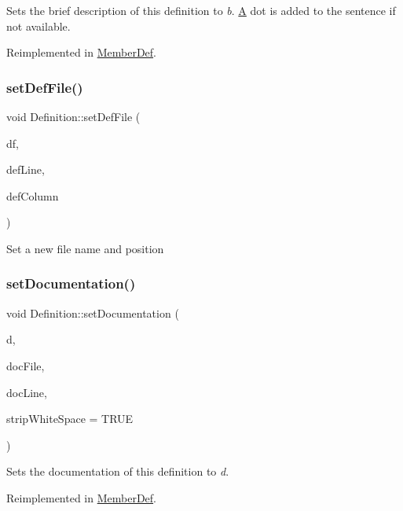 Sets the brief description of this definition to {\itshape b}. \mbox{\hyperlink{class_a}{A}} dot is added to the sentence if not available. 

Reimplemented in \mbox{\hyperlink{class_member_def_ac4a25886f70c3888e60c8e5d736720e5}{Member\+Def}}.

\mbox{\label{class_definition_a101ae2b46d12bd21492863a593d04d90}} 
\subsubsection{\texorpdfstring{setDefFile()}{setDefFile()}}
{\footnotesize\ttfamily void Definition\+::set\+Def\+File (\begin{DoxyParamCaption}\item[{const \mbox{\hyperlink{class_q_c_string}{Q\+C\+String}} \&}]{df,  }\item[{int}]{def\+Line,  }\item[{int}]{def\+Column }\end{DoxyParamCaption})}

Set a new file name and position \mbox{\label{class_definition_af13e2148f395d2704535e52f50ccc418}} 
\subsubsection{\texorpdfstring{setDocumentation()}{setDocumentation()}}
{\footnotesize\ttfamily void Definition\+::set\+Documentation (\begin{DoxyParamCaption}\item[{const char $\ast$}]{d,  }\item[{const char $\ast$}]{doc\+File,  }\item[{int}]{doc\+Line,  }\item[{bool}]{strip\+White\+Space = {\ttfamily TRUE} }\end{DoxyParamCaption})\hspace{0.3cm}{\ttfamily [virtual]}}

Sets the documentation of this definition to {\itshape d}. 

Reimplemented in \mbox{\hyperlink{class_member_def_a357486962b5d04cf93dbb52a7a2f2bf6}{Member\+Def}}.

